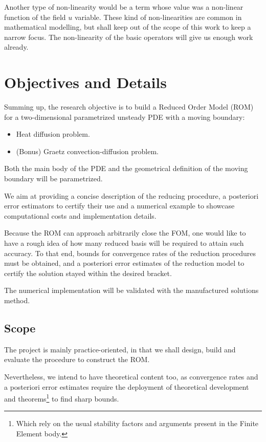 \documentclass[a4paper, technote, compsoc]{IEEEtran}
\begin{document}
Another type of non-linearity would be a term whose value was a non-linear function of the field $u$ variable. 
These kind of non-linearities are common in mathematical modelling, but shall keep out of the scope of this work to keep a narrow focus. 
The non-linearity of the basic operators will give us enough work already.

\section{Objectives and Details}
Summing up, the research objective is to build a Reduced Order Model (ROM) for a two-dimensional parametrized unsteady PDE with a moving boundary:
\begin{itemize}
   \item Heat diffusion problem.
   \item (Bonus) Graetz convection-diffusion problem.
\end{itemize}
Both the main body of the PDE and the geometrical definition of the moving boundary will be parametrized.

We aim at providing a concise description of the reducing procedure, 
a posteriori error estimators to certify their use and 
a numerical example to showcase computational costs and implementation details.

Because the ROM can approach arbitrarily close the FOM, one would like to have a rough idea of how many reduced basis will be required to attain such accuracy. 
To that end, bounds for convergence rates of the reduction procedures must be obtained, and a posteriori error estimates of the reduction model to certify the solution stayed within the desired bracket. 

The numerical implementation will be validated with the manufactured solutions method.

\subsection{Scope}
The project is mainly practice-oriented, in that we shall design, build and evaluate the procedure to construct the ROM.

Nevertheless, we intend to have theoretical content too, as convergence rates and a posteriori error estimates require the deployment of theoretical development and theorems\footnote{
   Which rely on the usual stability factors and arguments present in the Finite Element body.} 
to find sharp bounds.
\end{document}
